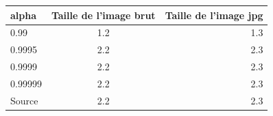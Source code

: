 \documentclass{report}
\begin{document}
			\begin{tabular}{|l|c|r|}
  			\hline
  			alpha & Taille de l'image brut & Taille de l'image jpg \\
  			\hline
  			0.99 & 1.2 & 1.3 \\
  			\hline
  			0.9995 & 2.2 & 2.3 \\
  			\hline
  			0.9999 & 2.2 & 2.3 \\
  			\hline
  			0.99999 & 2.2 & 2.3 \\
  			\hline
  			Source & 2.2 & 2.3 \\
  			\hline
			\end{tabular}
\end{document}
